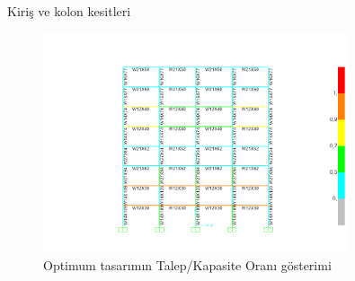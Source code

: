 \begin{table}
    \caption{Kiriş ve kolon kesitleri}
\end{table}

\begin{figure}[H]
    \centering
    \includegraphics[width=0.8\textwidth]{weeks_new/imgs/exmp7_fig5.png}
    \caption{Optimum tasarımın Talep/Kapasite Oranı gösterimi}
    \label{fig:dcr_values}
\end{figure}





